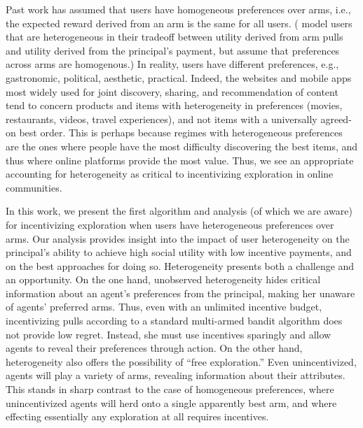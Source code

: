 Past work has assumed that users have homogeneous preferences over
arms, i.e., the expected reward derived from an arm is the same for all users.
(\citet{han2015incentivizing} model users that are
heterogeneous in their tradeoff between utility derived from arm pulls
and utility derived from the principal's payment,
but assume that preferences across arms are homogenous.)
In reality, users have different preferences, e.g., gastronomic,
political, aesthetic, practical.
Indeed, the websites and mobile apps most widely used for joint discovery,
sharing, and recommendation of content tend to concern products and items 
with heterogeneity in preferences (movies, restaurants,
videos, travel experiences), and not items with a universally
agreed-on best order.
This is perhaps because regimes with heterogeneous preferences are the
ones where people have the most difficulty discovering the best items, 
and thus where online platforms provide the most value.  
Thus, we see an appropriate
accounting for heterogeneity as critical to incentivizing
exploration in online communities.

In this work, we present the first algorithm and analysis (of which we
are aware) for incentivizing exploration when users have heterogeneous 
preferences over arms.
Our analysis provides insight into the
impact of user heterogeneity on the principal's ability to achieve
high social utility with low incentive payments,
and on the best approaches for doing so.
Heterogeneity presents both a challenge and an opportunity.
On the one hand, unobserved heterogeneity hides critical
information about an agent's preferences from the principal,
making her unaware of agents' preferred arms.
Thus, even with an unlimited incentive budget, incentivizing 
pulls according to a standard multi-armed bandit algorithm does not provide
low regret.  Instead, she must use incentives sparingly and 
allow agents to reveal their preferences through action.
On the other hand, heterogeneity also offers
the possibility of ``free exploration.''
Even unincentivized, agents will
play a variety of arms, revealing information about their attributes.
This stands in sharp contrast to the case of homogeneous preferences,
where unincentivized agents will herd onto a single apparently best arm,
and where effecting essentially any exploration at all requires incentives.


